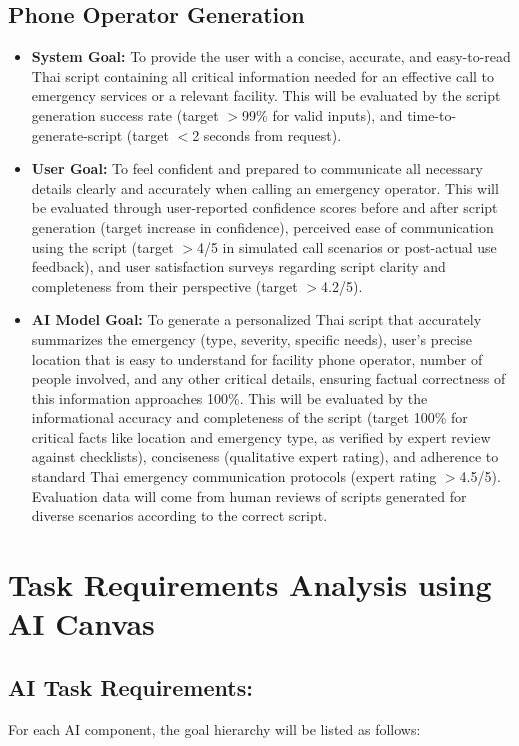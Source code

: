 \subsection{Phone Operator Generation}
\label{subsec:goal_phone_operator}
\begin{itemize}
    \item \textbf{System Goal:} To provide the user with a concise, accurate, and easy-to-read Thai script containing all critical information needed for an effective call to emergency services or a relevant facility. This will be evaluated by the script generation success rate (target $>$99\% for valid inputs), and time-to-generate-script (target $<$2 seconds from request).
    \item \textbf{User Goal:} To feel confident and prepared to communicate all necessary details clearly and accurately when calling an emergency operator. This will be evaluated through user-reported confidence scores before and after script generation (target increase in confidence), perceived ease of communication using the script (target $>$4/5 in simulated call scenarios or post-actual use feedback), and user satisfaction surveys regarding script clarity and completeness from their perspective (target $>$4.2/5).
    \item \textbf{AI Model Goal:} To generate a personalized Thai script that accurately summarizes the emergency (type, severity, specific needs), user's precise location that is easy to understand for facility phone operator, number of people involved, and any other critical details, ensuring factual correctness of this information approaches 100\%. This will be evaluated by the informational accuracy and completeness of the script (target 100\% for critical facts like location and emergency type, as verified by expert review against checklists), conciseness (qualitative expert rating), and adherence to standard Thai emergency communication protocols (expert rating $>$4.5/5). Evaluation data will come from human reviews of scripts generated for diverse scenarios according to the correct script.
\end{itemize}

\section{Task Requirements Analysis using AI Canvas}
\label{sec:task_requirements_analysis}

\subsection{AI Task Requirements:}
\label{subsec:ai_task_requirements_intro}
For each AI component, the goal hierarchy will be listed as follows: %

